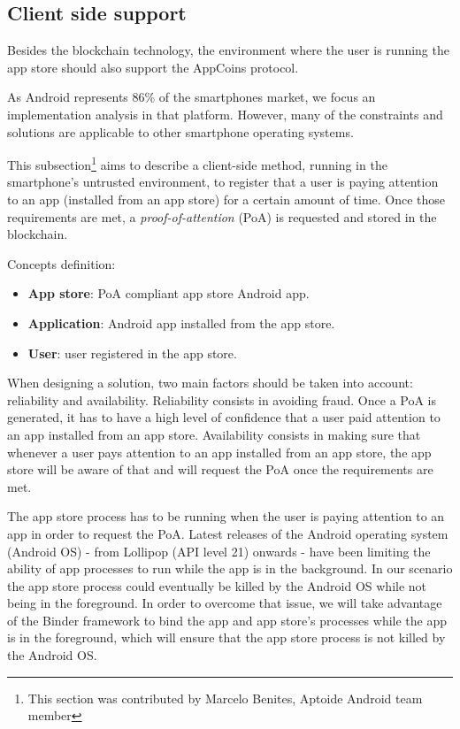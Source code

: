 \subsection{Client side support}

Besides the blockchain technology, the environment where the user is running the app store should 
also support the AppCoins protocol.


As Android represents 86\% of the smartphones market, we focus an implementation analysis in that 
platform. However, many of the constraints and solutions are applicable to other smartphone operating systems.

This subsection\footnote{This section was contributed by Marcelo Benites, Aptoide Android team 
member} aims to describe a client-side method, running in the smartphone's untrusted environment, to 
register that a user is paying attention to an app (installed from an app store) for a certain amount of time. Once those requirements are met, a \textit{proof-of-attention} (PoA) is requested and stored in the 
blockchain.
 
 
Concepts definition: %
\begin{itemize}
\item {\bf App store}: PoA compliant app store Android app.
\item {\bf Application}: Android app installed from the app store.
\item {\bf User}: user registered in the app store.
\end{itemize}

When designing a solution, two main factors should be taken into account: reliability and availability. 
Reliability consists in avoiding fraud. Once a \textsf{PoA} is generated, it has to have a high level of 
confidence that a user paid attention to an app installed from an app store. Availability consists in 
making sure that whenever a user pays attention to an app installed from an app store, the app store 
will be aware of that and will request the \textsf{PoA} once the requirements are met. %

The app store process has to be running when the user is paying attention to an app in order to request  
the \textsf{PoA}. Latest releases of the Android operating system (Android OS) - from Lollipop (API 
level 21) onwards - have been limiting the ability of app processes to run while the app is in the 
background. In our scenario the app store process could eventually be killed by the Android OS while 
not being in the foreground. In order to overcome that issue, we will take advantage of the Binder 
framework to bind the app and app store's processes while the app is in the foreground, which will 
ensure that the app store process is not killed by the Android OS. 

